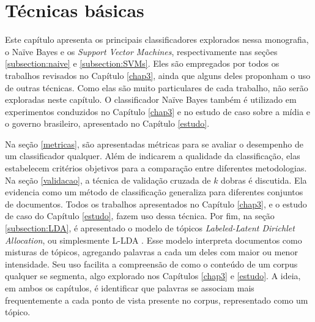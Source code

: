 \chapter{Técnicas básicas}
\label{basicos}

Este capítulo apresenta os principais classificadores explorados nessa monografia, o Naïve Bayes e os \emph{Support Vector Machines}, respectivamente nas seções \ref{subsection:naive} e \ref{subsection:SVMs}. Eles são empregados por todos os trabalhos revisados no Capítulo \ref{chap3}, ainda que alguns deles proponham o uso de outras técnicas. Como elas são muito particulares de cada trabalho, não serão exploradas neste capítulo. O classificador Naïve Bayes também é utilizado em experimentos conduzidos no Capítulo \ref{chap3} e no estudo de caso sobre a mídia e o governo brasileiro, apresentado no Capítulo \ref{estudo}. 


Na seção \ref{metricas}, são apresentadas métricas para se avaliar o desempenho de um classificador qualquer. Além de indicarem a qualidade da classificação, elas estabelecem critérios objetivos para a comparação entre diferentes metodologias. Na seção \ref{validacao}, a técnica de validação cruzada de \ensuremath{k} dobras é discutida. Ela evidencia como um método de classificação generaliza para diferentes conjuntos de documentos. Todos os trabalhos apresentados no Capítulo \ref{chap3}, e o estudo de caso do Capítulo \ref{estudo}, fazem uso dessa técnica. Por fim, na seção \ref{subsection:LDA}, é apresentado o modelo de tópicos \emph{Labeled-Latent Dirichlet Allocation}, ou simplesmente L-LDA \cite{llda}. Esse modelo interpreta documentos como misturas de tópicos, agregando palavras a cada um deles com maior ou menor intensidade. Seu uso facilita a compreensão de como o conteúdo de um corpus qualquer se segmenta, algo explorado nos Capítulos \ref{chap3} e \ref{estudo}. A ideia, em ambos os capítulos, é identificar que palavras se associam mais frequentemente a cada ponto de vista presente no corpus, representado como um tópico. 


